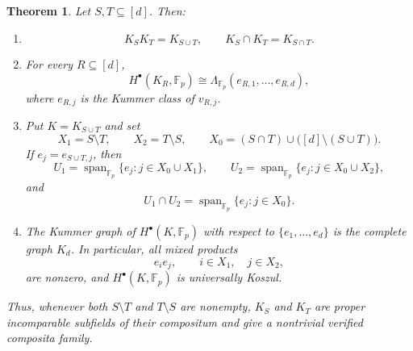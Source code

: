 \documentclass[12pt]{amsart}
\theoremstyle{plain}
\newtheorem{theorem}{Theorem}[section]
\theoremstyle{definition}
\theoremstyle{remark}
\numberwithin{equation}{section}
\newcommand{\Fp}{\mathbb{F}_p}
\newcommand{\Span}{\operatorname{span}}
\begin{document}
\begin{theorem}
\label{thm:laurent-composita}
Let \(S,T\subseteq[d]\). Then:
\begin{enumerate}[label=\textnormal{(\alph*)}]
\item\label{laurent-fields}
\[
K_SK_T=K_{S\cup T},
\qquad
K_S\cap K_T=K_{S\cap T}.
\]

\item\label{laurent-cohomology}
For every \(R\subseteq[d]\),
\[
H^\bullet(K_R,\Fp)
\cong
\Lambda_{\Fp}(e_{R,1},\dots,e_{R,d}),
\]
where \(e_{R,j}\) is the Kummer class of \(v_{R,j}\).

\item\label{laurent-images}
Put \(K=K_{S\cup T}\) and set
\[
X_1=S\setminus T,\qquad
X_2=T\setminus S,\qquad
X_0=(S\cap T)\cup\bigl([d]\setminus(S\cup T)\bigr).
\]
If \(e_j=e_{S\cup T,j}\), then
\[
U_1
=
\Span_{\Fp}\{e_j:j\in X_0\cup X_1\},
\qquad
U_2
=
\Span_{\Fp}\{e_j:j\in X_0\cup X_2\},
\]
and
\[
U_1\cap U_2
=
\Span_{\Fp}\{e_j:j\in X_0\}.
\]

\item\label{laurent-graph}
The Kummer graph of \(H^\bullet(K,\Fp)\) with respect to
\(\{e_1,\dots,e_d\}\) is the complete graph \(K_d\). In particular,
all mixed products
\[
e_i e_j,
\qquad
i\in X_1,\quad j\in X_2,
\]
are nonzero, and \(H^\bullet(K,\Fp)\) is universally Koszul.
\end{enumerate}
Thus, whenever both \(S\setminus T\) and \(T\setminus S\) are
nonempty, \(K_S\) and \(K_T\) are proper incomparable subfields of
their compositum and give a nontrivial verified composita family.
\end{theorem}
\end{document}
